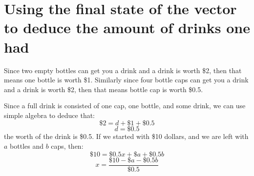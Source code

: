 \documentclass[letterpaper, 12pt]{article}
\begin{document}
\section{Using the final state of the vector to deduce the amount of drinks one had}
\par Since two empty bottles can get you a drink and a drink is worth \$2, then that means one bottle is worth \$1.
Similarly since four bottle caps can get you a drink and a drink is worth \$2, then that means bottle cap is worth \$0.5.
\par Since a full drink is consisted of one cap, one bottle, and some drink, we can use simple algebra to deduce that:
\begin{equation}
    \$2 = d + \$1 + \$0.5
\end{equation}
\begin{equation}
    d = \$0.5
\end{equation}
the worth of the drink is \$0.5.
If we started with \$10 dollars, and we are left with $a$ bottles and $b$ caps, then:
\begin{equation}
    \$10 = \$0.5x + \$a + \$0.5b
\end{equation}
\begin{equation}
    x = \frac{\$10 - \$a - \$0.5b}{\$0.5}
\end{equation}
\end{document}
